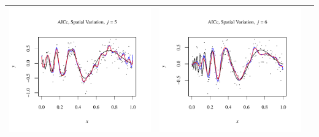 \documentclass[11pt]{article}
\begin{document}
\begin{table}[h!]
\begin{center}
\begin{tabular}{| >{\centering\arraybackslash}m{2.1in} |  >{\centering\arraybackslash}m{2.1in} |  >{\centering\arraybackslash}m{2.1in}|}
      \includegraphics[width=1\linewidth,height=0.18\textheight]{Graphs/3/3/assignment5_a_3_3_5}&
      \includegraphics[width=1\linewidth,height=0.18\textheight]{Graphs/3/3/assignment5_a_3_3_6}\\\hline
    \end{tabular}
  \end{center}
\end{table}
\end{document}
